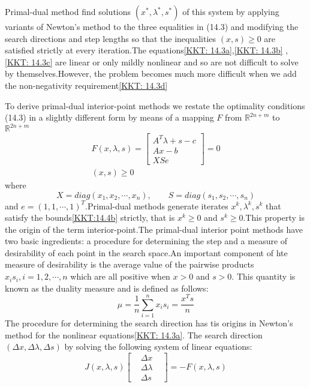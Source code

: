 Primal-dual method find solutions $(x^*, \lambda^*, s^*)$ of this system by applying variants of Newton's method to the
three equalities in (14.3) and modifying the search directions and step lengths so that the inequalities
$(x, s) \geq 0$ are satisfied strictly at every iteration.The equations\eqref{KKT: 14.3a},\eqref{KKT: 14.3b}
,\eqref{KKT: 14.3c} are linear or only mildly nonlinear and so are not difficult to solve by themselves.However, the problem
becomes much more difficult when we add the non-negativity requirement\eqref{KKT: 14.3d}
\par To derive primal-dual interior-point methods we restate the optimality conditions (14.3) in a slightly different form
by means of a mapping $F$ from $\mathbb{R}^{2n + m}$ to $\mathbb{R}^{2n + m}$
\begin{align}
    F(x, \lambda, s) =
    \begin{bmatrix}
        A^T\lambda + s - c\\
        Ax - b \\
        XSe
    \end{bmatrix} = 0 \tag{14.4a}\label{KKT: 14.4a}\\
    (x, s) \tag{14.4b} \label{KKT:14.4b}\geq 0
\end{align}
where
\[
    X = diag(x_1, x_2,\cdots,x_n), \qquad S = diag(s_1, s_2, \cdots, s_n) \tag{14.5}\label{KKT: 14.5}
\]
and $e = (1,1,\cdots, 1)^T$.Primal-dual methods generate iterates $x^k, \lambda^k, s^k $ that satisfy the
bounds\eqref{KKT:14.4b} strictly, that is $x^k \geq 0$ and $s^k \geq 0$.This property is the origin of the term
interior-point.The primal-dual interior point methods have two basic ingredients: a procedure for determining the step
and a measure of desirability of each point in the search space.An important component of hte measure of desirability
is the average value of the pairwise products $x_i s_i ,i = 1,2,\cdots ,n $ which are all positive when $x > 0$ and $s > 0$.
This quantity is known as the duality measure and is defined as follows:
\[
    \mu = \frac{1}{n} \sum_{i=1}^n x_i s_i = \frac{x^T s}{n} \tag{14.6} \label{ipm: 14.6}
\]
The procedure for determining the search direction has tis origins in Newton's method for the nonlinear
equations\eqref{KKT: 14.3a}.
The search direction $(\Delta x, \Delta \lambda, \Delta s)$ by solving the following system of linear equations:
\[
    J(x, \lambda, s)
    \begin{bmatrix}
        & \Delta x &\\
        & \Delta \lambda & \\
        & \Delta s &
    \end{bmatrix}
    = -F(x,\lambda, s)
\]
